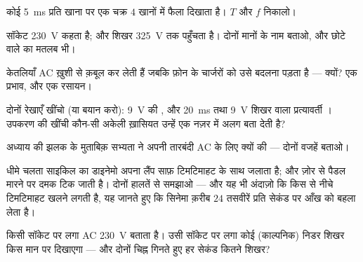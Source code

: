 \begin{exercise}[$\star$]\label{exo:g9:alternating-current:4}
कोई  \qty{5}{ms} प्रति खाना पर एक चक्र $4$ खानों में फैला
दिखाता है। $T$ और $f$ निकालो।
\end{exercise}

\begin{exercise}[$\star$]\label{exo:g9:alternating-current:5}
सॉकेट \qty{230}{V} कहता है; और शिखर \qty{325}{V} तक पहुँचता है। दोनों
मानों के नाम बताओ, और छोटे वाले का मतलब भी।
\end{exercise}

\begin{exercise}[$\star$]\label{exo:g9:alternating-current:6}
केतलियाँ AC ख़ुशी से क़बूल कर लेती हैं जबकि फ़ोन के चार्जरों को उसे
बदलना पड़ता है --- क्यों? एक प्रभाव, और एक रसायन।
\end{exercise}

\begin{exercise}[$\star$]\label{exo:g9:alternating-current:7}
दोनों रेखाएँ खींचो (या बयान करो): \qty{9}{V} की , और
\qty{20}{ms}  तथा \qty{9}{V} शिखर वाला प्रत्यावर्ती ।
उपकरण की खींची कौन-सी अकेली ख़ासियत उन्हें एक नज़र में अलग बता देती
है?
\end{exercise}

\begin{exercise}[$\star$]\label{exo:g9:alternating-current:8}
अध्याय की झलक के मुताबिक़ सभ्यता ने अपनी तारबंदी AC के लिए क्यों की ---
दोनों वजहें बताओ।
\end{exercise}

\begin{exercise}[$\star\star$]\label{exo:g9:alternating-current:9}
धीमे चलता साइकिल का डाइनेमो अपना लैंप साफ़ टिमटिमाहट के साथ जलाता है;
और ज़ोर से पैडल मारने पर दमक टिक जाती है। दोनों हालतें  से
समझाओ --- और यह भी अंदाज़ो कि किस  से नीचे टिमटिमाहट खलने लगती
है, यह जानते हुए कि सिनेमा क़रीब $24$ तसवीरें प्रति सेकंड पर आँख को
बहला लेता है।
\end{exercise}

\begin{exercise}[$\star\star$]\label{exo:g9:alternating-current:10}
किसी सॉकेट पर लगा AC  \qty{230}{V} बताता है। उसी सॉकेट पर लगा
कोई (काल्पनिक) निडर  शिखर किस मान पर दिखाएगा --- और दोनों
चिह्न गिनते हुए हर सेकंड कितने शिखर?
\end{exercise}

